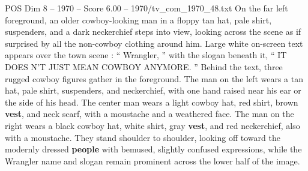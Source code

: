 \begin{textsample}{POS Dim 8 – 1970 – Score 6.00 – 1970/tv\_com\_1970\_48.txt}
On the far left foreground, an older cowboy-looking man in a floppy tan hat, pale shirt, suspenders, and a dark neckerchief steps into view, looking across the scene as if surprised by all the non-cowboy clothing around him.
Large white on-screen text appears over the town scene : “ Wrangler, ” with the slogan beneath it, “ IT DOES N’T JUST MEAN COWBOY ANYMORE. ” Behind the text, three rugged cowboy figures gather in the foreground.
The man on the left wears a tan hat, pale shirt, suspenders, and neckerchief, with one hand raised near his ear or the side of his head.
The center man wears a light cowboy hat, red shirt, brown \textbf{vest}, and neck scarf, with a moustache and a weathered face.
The man on the right wears a black cowboy hat, white shirt, gray \textbf{vest}, and red neckerchief, also with a moustache.
They stand shoulder to shoulder, looking off toward the modernly dressed \textbf{people} with bemused, slightly confused expressions, while the Wrangler name and slogan remain prominent across the lower half of the image.

\end{textsample}
